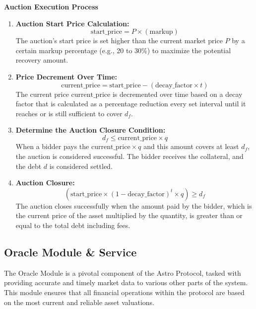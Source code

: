 \textbf{Auction Execution Process}
\begin{enumerate}
    \item \textbf{Auction Start Price Calculation:}
    \[
    \text{start\_price} = P \times (\text{markup})
    \]
    The auction's start price is set higher than the current market price \( P \) by a certain markup percentage (e.g., 20 to 30\%) to maximize the potential recovery amount.

    \item \textbf{Price Decrement Over Time:}
    \[
    \text{current\_price} = \text{start\_price} - (\text{decay\_factor} \times t)
    \]
    The current price \(\text{current\_price}\) is decremented over time based on a decay factor that is calculated as a percentage reduction every set interval until it reaches or is still sufficient to cover \( d_f \).

    \item \textbf{Determine the Auction Closure Condition:}
    \[
    d_f \leq \text{current\_price} \times q
    \]
    When a bidder pays the \(\text{current\_price} \times q\) and this amount covers at least \( d_f \), the auction is considered successful. The bidder receives the collateral, and the debt \( d \) is considered settled.

    \item \textbf{Auction Closure:}
    \[
    (\text{start\_price} \times (1 - \text{decay\_factor})^t \times q) \geq d_f
    \]
    The auction closes successfully when the amount paid by the bidder, which is the current price of the asset multiplied by the quantity, is greater than or equal to the total debt including fees.
\end{enumerate}
\newpage
\subsection{Oracle Module \& Service}
The Oracle Module is a pivotal component of the Astro Protocol, tasked with providing accurate and timely market data to various other parts of the system. This module ensures that all financial operations within the protocol are based on the most current and reliable asset valuations.

